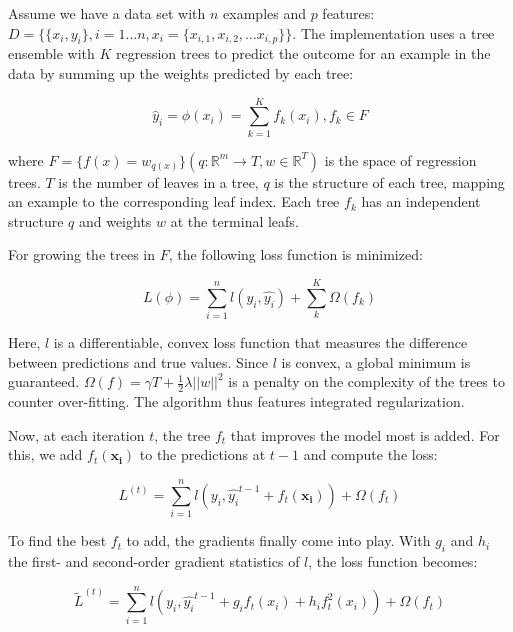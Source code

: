 \documentclass[
  11pt,
  a4paper,
  DIV=12,captions=tableheading,oneside,titlepage]{scrbook}
\begin{document}
Assume we have a data set with \(n\) examples and \(p\) features: \(D = \{\{x_i,y_i\}, i=1\ldots n, x_i=\{x_{i,1}, x_{i,2}, \ldots x_{i,p}\}\}\). The implementation uses a tree ensemble with \(K\) regression trees to predict the outcome for an example in the data by summing up the weights predicted by each tree:

\begin{equation}
\hat{y}_i = \phi(x_i) = \sum_{k=1}^K f_k(x_i), f_k \in F
\label{eq:gbm-ensemble}
\end{equation}

where \(F = \{f(x) = w_{q(x)}\} (q: \mathbb{R}^m \rightarrow T, w \in \mathbb{R}^T)\) is the space of regression trees. \(T\) is the number of leaves in a tree, \(q\) is the structure of each tree, mapping an example to the corresponding leaf index. Each tree \(f_k\) has an independent structure \(q\) and weights \(w\) at the terminal leafs.

For growing the trees in \(F\), the following loss function is minimized:

\begin{equation}
L(\phi) = \sum_{i=1}^n l(y_i, \hat{y_i}) + \sum_k^K \Omega(f_k)
\label{eq:gbm-loss}
\end{equation}

Here, \(l\) is a differentiable, convex loss function that measures the difference between predictions and true values. Since \(l\) is convex, a global minimum is guaranteed. \(\Omega(f) = \gamma T + \frac{1}{2}\lambda||w||^2\) is a penalty on the complexity of the trees to counter over-fitting. The algorithm thus features integrated regularization.

Now, at each iteration \(t\), the tree \(f_t\) that improves the model most is added. For this, we add \(f_t(\mathbf{x_i})\) to the predictions at \(t-1\) and compute the loss:

\begin{equation}
L^{(t)} = \sum_{i=1}^n l(y_i, \hat{y_i}^{t-1} + f_t(\mathbf{x_i})) +\Omega(f_t)
\label{eq:gbm-iterate}
\end{equation}

To find the best \(f_t\) to add, the gradients finally come into play. With \(g_i\) and \(h_i\) the first- and second-order gradient statistics of \(l\), the loss function becomes:

\begin{equation}
\tilde{L}^{(t)} = \sum_{i=1}^n l(y_i, \hat{y_i}^{t-1} + g_if_t(x_i) + h_i f_t^2(x_i)) +\Omega(f_t)
\label{eq:gbm-grad}
\end{equation}
\end{document}
